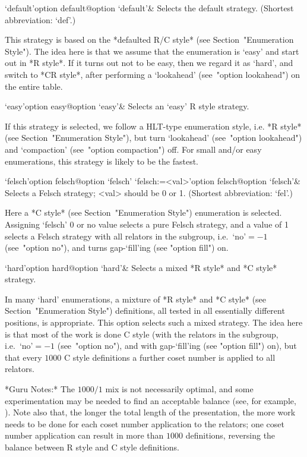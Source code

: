 \beginitems

\>`default'{option default}@{option `default'}&
Selects the default strategy. (Shortest abbreviation: `def'.)

This  strategy  is  based  on   the   *defaulted   R/C   style*   (see
Section~"Enumeration Style"). The idea here is that we assume that the
enumeration is \lq{}easy' and start out in *R style*. If it turns  out
not to be easy, then we regard it as \lq{}hard',  and  switch  to  *CR
style*, after performing a `lookahead' (see~"option lookahead") on the
entire table.

\>`easy'{option easy}@{option `easy'}&
Selects an \lq{}easy' R style strategy.

If this strategy is selected, we follow a HLT-type enumeration  style,
i.e. *R style* (see Section~"Enumeration Style"), but turn `lookahead'
(see~"option lookahead") and  `compaction'  (see~"option  compaction")
off. For small and/or easy enumerations, this strategy is likely to be
the fastest.

\>`felsch'{option felsch}@{option `felsch'}
\>`felsch:=<val>'{option felsch}@{option `felsch'}&
Selects a Felsch strategy; <val> should be 0 or 1. 
(Shortest abbreviation: `fel'.)

Here a *C style*  (see  Section~"Enumeration  Style")  enumeration  is
selected. Assigning `felsch' 0 or  no  value  selects  a  pure  Felsch
strategy, and a value of 1 selects a Felsch strategy with all relators
in  the  subgroup,  i.e.~`no'${}=-1$  (see~"option  no"),  and   turns
gap-`fill'ing (see "option fill") on.

\>`hard'{option hard}@{option `hard'}&  
Selects a mixed *R style* and *C style* strategy.

In many \lq{}hard' enumerations, a mixture of *R style* and *C  style*
(see Section~"Enumeration  Style")  definitions,  all  tested  in  all
essentially different positions, is appropriate. This  option  selects
such a mixed strategy. The idea here is that most of the work is  done
C  style  (with  the  relators  in  the   subgroup,   i.e.~`no'${}=-1$
(see~"option no"), and with gap-`fill'ing (see "option fill") on), but
that every $1000$ C  style  definitions  a  further  coset  number  is
applied to all relators.

*Guru  Notes:*
The $1000/1$ mix is not necessarily optimal, and some  experimentation
may be needed  to  find  an  acceptable  balance  (see,  for  example,
\cite{HR99b}). Note also that, the longer  the  total  length  of  the
presentation, the more work needs to be done  for  each  coset  number
application to the relators; one coset number application  can  result
in more than $1000$ definitions, reversing the balance between R style
and C style definitions.

